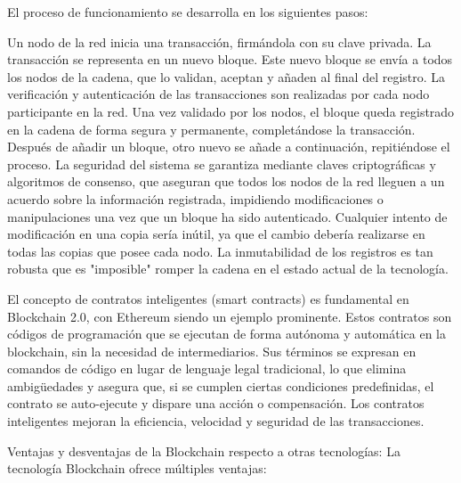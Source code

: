 El proceso de funcionamiento se desarrolla en los siguientes pasos:

Un nodo de la red inicia una transacción, firmándola con su clave privada.
La transacción se representa en un nuevo bloque.
Este nuevo bloque se envía a todos los nodos de la cadena, que lo validan, aceptan y añaden al final del registro. La verificación y autenticación de las transacciones son realizadas por cada nodo participante en la red.
Una vez validado por los nodos, el bloque queda registrado en la cadena de forma segura y permanente, completándose la transacción.
Después de añadir un bloque, otro nuevo se añade a continuación, repitiéndose el proceso.
La seguridad del sistema se garantiza mediante claves criptográficas y algoritmos de consenso, que aseguran que todos los nodos de la red lleguen a un acuerdo sobre la información registrada, impidiendo modificaciones o manipulaciones una vez que un bloque ha sido autenticado. Cualquier intento de modificación en una copia sería inútil, ya que el cambio debería realizarse en todas las copias que posee cada nodo. La inmutabilidad de los registros es tan robusta que es "imposible" romper la cadena en el estado actual de la tecnología.

El concepto de contratos inteligentes (smart contracts) es fundamental en Blockchain 2.0, con Ethereum siendo un ejemplo prominente. Estos contratos son códigos de programación que se ejecutan de forma autónoma y automática en la blockchain, sin la necesidad de intermediarios. Sus términos se expresan en comandos de código en lugar de lenguaje legal tradicional, lo que elimina ambigüedades y asegura que, si se cumplen ciertas condiciones predefinidas, el contrato se auto-ejecute y dispare una acción o compensación. Los contratos inteligentes mejoran la eficiencia, velocidad y seguridad de las transacciones.

Ventajas y desventajas de la Blockchain respecto a otras tecnologías: La tecnología Blockchain ofrece múltiples ventajas:

